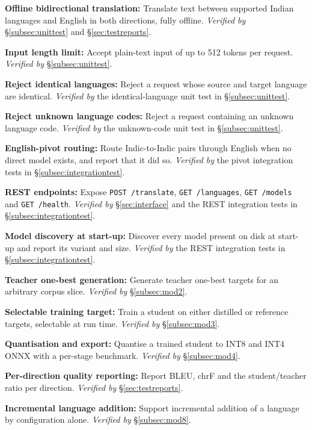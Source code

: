 \begin{bullets}
\item \textbf{Offline bidirectional translation:} Translate text between supported Indian languages and English in both directions, fully offline. \emph{Verified by} \S\ref{subsec:unittest} and \S\ref{sec:testreports}.
\item \textbf{Input length limit:} Accept plain-text input of up to 512 tokens per request. \emph{Verified by} \S\ref{subsec:unittest}.
\item \textbf{Reject identical languages:} Reject a request whose source and target language are identical. \emph{Verified by} the identical-language unit test in \S\ref{subsec:unittest}.
\item \textbf{Reject unknown language codes:} Reject a request containing an unknown language code. \emph{Verified by} the unknown-code unit test in \S\ref{subsec:unittest}.
\item \textbf{English-pivot routing:} Route Indic-to-Indic pairs through English when no direct model exists, and report that it did so. \emph{Verified by} the pivot integration tests in \S\ref{subsec:integrationtest}.
\item \textbf{REST endpoints:} Expose \texttt{POST /translate}, \texttt{GET /languages}, \texttt{GET /models} and \texttt{GET /health}. \emph{Verified by} \S\ref{sec:interface} and the REST integration tests in \S\ref{subsec:integrationtest}.
\item \textbf{Model discovery at start-up:} Discover every model present on disk at start-up and report its variant and size. \emph{Verified by} the REST integration tests in \S\ref{subsec:integrationtest}.
\item \textbf{Teacher one-best generation:} Generate teacher one-best targets for an arbitrary corpus slice. \emph{Verified by} \S\ref{subsec:mod2}.
\item \textbf{Selectable training target:} Train a student on either distilled or reference targets, selectable at run time. \emph{Verified by} \S\ref{subsec:mod3}.
\item \textbf{Quantisation and export:} Quantise a trained student to INT8 and INT4 ONNX with a per-stage benchmark. \emph{Verified by} \S\ref{subsec:mod4}.
\item \textbf{Per-direction quality reporting:} Report BLEU, chrF and the student/teacher ratio per direction. \emph{Verified by} \S\ref{sec:testreports}.
\item \textbf{Incremental language addition:} Support incremental addition of a language by configuration alone. \emph{Verified by} \S\ref{subsec:mod8}.
\end{bullets}


